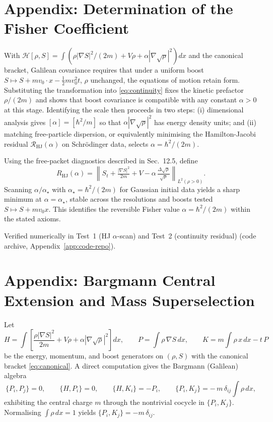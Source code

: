 \documentclass[11pt,a4paper]{article}
\numberwithin{equation}{section}
\theoremstyle{thmcompact}
\theoremstyle{remark}
\begin{document}
\section{Appendix: Determination of the Fisher Coefficient}
\label{app:fisher-coefficient}

With $\mathcal H[\rho,S]=\int(\rho|\nabla S|^2/(2m)+V\rho+\alpha|\nabla\sqrt\rho|^2)dx$
and the canonical bracket, Galilean covariance requires that under a uniform boost
$S\mapsto S+m v_0\!\cdot\!x-\tfrac12 m v_0^2t$, $\rho$ unchanged,
the equations of motion retain form.
Substituting the transformation into \eqref{eq:continuity} fixes the kinetic prefactor $\rho/(2m)$ and shows that boost covariance is compatible with any constant $\alpha>0$ at this stage. Identifying the scale then proceeds in two steps: (i) dimensional analysis gives $[\alpha]=[\hbar^2/m]$ so that $\alpha|\nabla\sqrt\rho|^2$ has energy density units; and (ii) matching free-particle dispersion, or equivalently minimising the Hamilton-Jacobi residual $\mathcal{R}_{\mathrm{HJ}}(\alpha)$ on Schrödinger data, selects
\(
\alpha=\hbar^2/(2m).
\)


Using the free-packet diagnostics described in Sec.~12.5, define
\[
R_{\mathrm{HJ}}(\alpha)
=\left\lVert S_t+\tfrac{|\nabla S|^2}{2m}+V
-\alpha\,\tfrac{\Delta\sqrt\rho}{\sqrt\rho}\right\rVert_{L^2(\rho>0)}.
\]
Scanning $\alpha/\alpha_\star$ with $\alpha_\star=\hbar^2/(2m)$
for Gaussian initial data yields a sharp minimum at $\alpha=\alpha_\star$,
stable across the resolutions and boosts tested $S\mapsto S+m v_0x$.
This identifies the reversible Fisher value
\(
\alpha=\hbar^2/(2m)
\)
within the stated axioms.

Verified numerically in Test~1 (HJ $\alpha$-scan) and Test~2 (continuity residual) (code archive, Appendix~\ref{app:code-repo}).


\section{Appendix: Bargmann Central Extension and Mass Superselection}
\label{app:bargmann}
Let
\[
H=\int\!\!\left[\frac{\rho|\nabla S|^2}{2m}+V\rho+\alpha|\nabla\sqrt\rho|^2\right]dx,
\qquad
P=\int \rho\,\nabla S\,dx,
\qquad
K=m\!\int \rho\,x\,dx - t\,P
\]
be the energy, momentum, and boost generators on $(\rho,S)$ with the canonical bracket \eqref{eq:canonical}.
A direct computation gives the Bargmann (Galilean) algebra
\[
\{P_i,P_j\}=0,\qquad
\{H,P_i\}=0,\qquad
\{H,K_i\}=-P_i,\qquad
\{P_i,K_j\}=-\,m\,\delta_{ij}\!\int\!\rho\,dx,
\]
exhibiting the central charge $m$ through the nontrivial cocycle in $\{P_i,K_j\}$.
Normalising $\int\rho\,dx=1$ yields $\{P_i,K_j\}=-m\,\delta_{ij}$.
\end{document}
